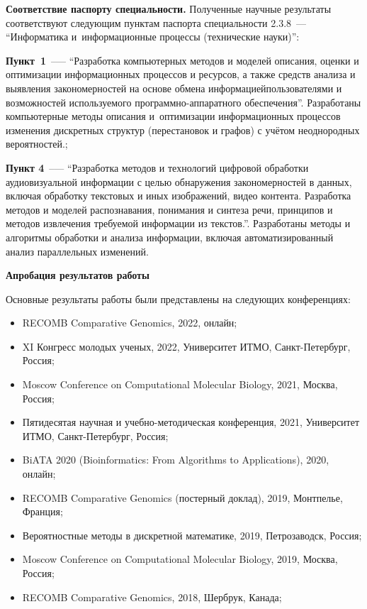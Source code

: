 \textbf{Соответствие паспорту специальности.}
Полученные научные результаты соответствуют следующим пунктам паспорта специальности 2.3.8~--- ``Информатика и информационные процессы (технические науки)'':

\textbf{Пункт 1}~--— ``Разработка компьютерных методов и моделей описания, оценки и оптимизации информационных процессов и ресурсов, а также средств анализа и выявления закономерностей на основе обмена информациейпользователями и возможностей используемого программно-аппаратного обеспечения''.
Разработаны компьютерные методы описания и оптимизации информационных процессов изменения дискретных структур (перестановок и графов) с учётом неоднородных вероятностей.;

\textbf{Пункт 4}~--— ``Разработка методов и технологий цифровой обработки аудиовизуальной информации с целью обнаружения закономерностей в данных, включая обработку текстовых и иных изображений, видео контента. Разработка методов и моделей распознавания, понимания и синтеза речи, принципов и методов извлечения требуемой информации из текстов.''.
Разработаны методы и алгоритмы обработки и анализа информации, включая автоматизированный анализ параллельных изменений.


\textbf{Апробация результатов работы}

Основные результаты работы были представлены на следующих  конференциях:

\begin{itemize}
    \item RECOMB Comparative Genomics, 2022, онлайн;
    \item XI Конгресс молодых ученых, 2022, Университет ИТМО, Санкт-Петербург, Россия;
    \item Moscow Conference on Computational Molecular Biology, 2021, Москва, Россия;
    \item Пятидесятая научная и учебно-методическая конференция, 2021, Университет ИТМО, Санкт-Петербург, Россия;
    \item BiATA 2020 (Bioinformatics: From Algorithms to Applications), 2020, онлайн;
    \item RECOMB Comparative Genomics (постерный доклад), 2019, Монтпелье, Франция;
    \item Вероятностные методы в дискретной математике, 2019, Петрозаводск, Россия;
    \item Moscow Conference on Computational Molecular Biology, 2019, Москва, Россия;
    \item RECOMB Comparative Genomics, 2018, Шербрук, Канада;
\end{itemize}